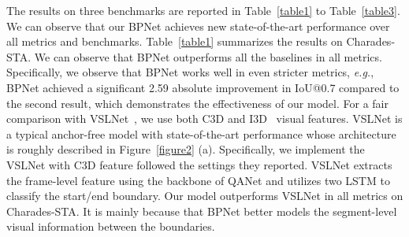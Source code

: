 \documentclass[letterpaper]{article} %
\newcommand{\eg}{\emph{e.g.}}
\begin{document}
The results on three benchmarks are reported in Table~\ref{table1} to Table~\ref{table3}. We can observe that our BPNet achieves new state-of-the-art performance over all metrics and benchmarks.
Table~\ref{table1} summarizes the results on Charades-STA. 
We can observe that BPNet outperforms all the baselines 
in all metrics.
Specifically, we observe that BPNet works well in even stricter metrics, 
\eg, BPNet achieved a significant 2.59 absolute improvement in IoU@0.7 
compared to the second result, which demonstrates the effectiveness of 
our model.
For a fair comparison with VSLNet~\cite{DBLP:conf/acl/ZhangSJZ20}, we use both C3D and I3D~\cite{DBLP:conf/cvpr/CarreiraZ17} visual features. 
VSLNet is a typical anchor-free model with state-of-the-art performance 
whose architecture is roughly described in Figure~\ref{figure2} (a). 
Specifically, we implement the VSLNet with C3D feature followed the settings they reported. 
VSLNet extracts the frame-level feature using the backbone of QANet and utilizes two 
LSTM to classify the start/end boundary. 
Our model outperforms VSLNet in all metrics on Charades-STA. It is mainly because that 
BPNet better models the segment-level visual information between the boundaries.
\end{document}

